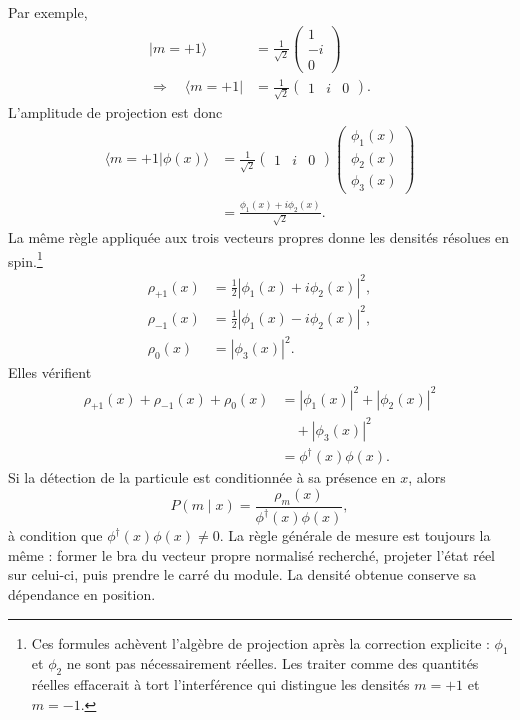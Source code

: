 Par exemple,
\begin{equation}
\begin{aligned}
|m=+1\rangle
&=
\frac{1}{\sqrt2}
\begin{pmatrix}
1\\
-i\\
0
\end{pmatrix}
\\
\Longrightarrow\quad\langle m=+1|
&=
\frac{1}{\sqrt2}
\begin{pmatrix}
1&i&0
\end{pmatrix}.
\end{aligned}
\end{equation}
L’amplitude de projection est donc
\begin{align}
\langle m=+1|\phi(x)\rangle
&=
\frac{1}{\sqrt2}
\begin{pmatrix}
1&i&0
\end{pmatrix}
\begin{pmatrix}
\phi_1(x)\\
\phi_2(x)\\
\phi_3(x)
\end{pmatrix}\\
&=
\frac{\phi_1(x)+i\phi_2(x)}{\sqrt2}.
\end{align}
La même règle appliquée aux trois vecteurs propres donne les densités résolues en spin.\footnote{Ces formules achèvent l’algèbre de projection après la correction explicite : \(\phi_1\) et \(\phi_2\) ne sont pas nécessairement réelles. Les traiter comme des quantités réelles effacerait à tort l’interférence qui distingue les densités \(m=+1\) et \(m=-1\).}
\begin{align}
\rho_{+1}(x)
&=
\frac12\left|\phi_1(x)+i\phi_2(x)\right|^2,\\
\rho_{-1}(x)
&=
\frac12\left|\phi_1(x)-i\phi_2(x)\right|^2,\\
\rho_0(x)
&=
|\phi_3(x)|^2.
\end{align}
Elles vérifient
\begin{equation}
\begin{aligned}
\rho_{+1}(x)+\rho_{-1}(x)+\rho_0(x)
&=
|\phi_1(x)|^2+|\phi_2(x)|^2
\\
&\quad{}+|\phi_3(x)|^2
\\
&=
\phi^\dagger(x)\phi(x).
\end{aligned}
\end{equation}
Si la détection de la particule est conditionnée à sa présence en \(x\), alors
\begin{equation}
P(m\mid x)
=
\frac{\rho_m(x)}{\phi^\dagger(x)\phi(x)},
\end{equation}
à condition que \(\phi^\dagger(x)\phi(x)\neq0\). La règle générale de mesure est toujours la même : former le bra du vecteur propre normalisé recherché, projeter l’état réel sur celui-ci, puis prendre le carré du module. La densité obtenue conserve sa dépendance en position.


